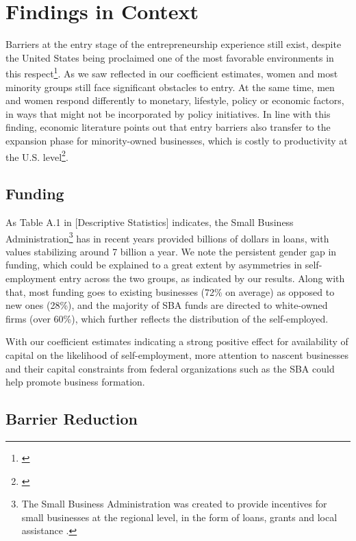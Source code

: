 \section{Findings in Context}

Barriers at the entry stage of the entrepreneurship experience still exist, despite the United States being proclaimed one of the most favorable environments in this respect\footnote{\cite{Autio2007}}. As we saw reflected in our coefficient estimates, women and most minority groups still face significant obstacles to entry. At the same time, men and women respond differently to monetary, lifestyle, policy or economic factors, in ways that might not be incorporated by policy initiatives. In line with this finding, economic literature points out that entry barriers also transfer to the expansion phase for minority-owned businesses, which is costly to productivity at the U.S. level\footnote{\cite{ReynoldsWhite1997}}. 

\subsection{Funding}

As Table A.1 in [Descriptive Statistics] indicates, the Small Business Administration\footnote{The Small Business Administration was created to provide incentives for small businesses at the regional level, in the form of loans, grants and local assistance \cite{SBA}.} has in recent years provided billions of dollars in loans, with values stabilizing around 7 billion a year. We note the persistent gender gap in funding, which could be explained to a great extent by asymmetries in self-employment entry across the two groups, as indicated by our results. Along with that, most funding goes to existing businesses (72\% on average) as opposed to new ones (28\%), and the majority of SBA funds are directed to white-owned firms (over 60\%), which further reflects the distribution of the self-employed. 

With our coefficient estimates indicating a strong positive effect for availability of capital on the likelihood of self-employment, more attention to nascent businesses and their capital constraints from federal organizations such as the SBA could help promote business formation. 

\subsection{Barrier Reduction}

